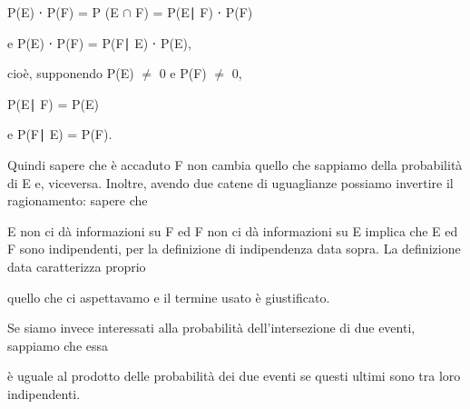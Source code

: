 \documentclass[a4paper,portrait,12pt]{article}
\begin{document}
\begin{flushleft}
P(E) ⋅ P(F) = P (E $\cap$ F) = P(E∣ F) ⋅ P(F)
\end{flushleft}





\begin{flushleft}
e P(E) ⋅ P(F) = P(F∣ E) ⋅ P(E),
\end{flushleft}





\begin{flushleft}
cio\`{e}, supponendo P(E) $\neq$ 0 e P(F) $\neq$ 0,
\end{flushleft}


\begin{flushleft}
P(E∣ F) = P(E)
\end{flushleft}





\begin{flushleft}
e P(F∣ E) = P(F).
\end{flushleft}





\begin{flushleft}
Quindi sapere che \`{e} accaduto F non cambia quello che sappiamo della probabilit\`{a} di E e, viceversa. Inoltre, avendo due catene di uguaglianze possiamo invertire il ragionamento: sapere che
\end{flushleft}


\begin{flushleft}
E non ci d\`{a} informazioni su F ed F non ci d\`{a} informazioni su E implica che E ed F sono indipendenti, per la definizione di indipendenza data sopra. La definizione data caratterizza proprio
\end{flushleft}


\begin{flushleft}
quello che ci aspettavamo e il termine usato \`{e} giustificato.
\end{flushleft}


\begin{flushleft}
Se siamo invece interessati alla probabilit\`{a} dell'intersezione di due eventi, sappiamo che essa
\end{flushleft}


\begin{flushleft}
\`{e} uguale al prodotto delle probabilit\`{a} dei due eventi se questi ultimi sono tra loro indipendenti.
\end{flushleft}
\end{document}
